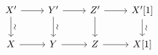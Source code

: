 \documentclass[12pt]{standalone}
\begin{document}
        $$

\begin{tikzcd}
X^\prime \ar[r] \ar[d,"\sim"{sloped}] & Y^\prime \ar[r] \ar[d,"\sim"{sloped}] & Z^\prime \ar[r] \ar[d] & 
X^\prime[1] \ar[d,"\sim"{sloped}] \\
X \ar[r] & Y \ar[r] & Z \ar[r] & X[1] 
\end{tikzcd}
        $$
        
\end{document}
